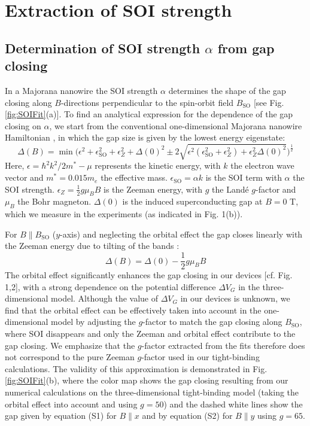 \newpage
\section{Extraction of SOI strength}
\subsection{Determination of SOI strength $\alpha$ from gap closing}
In a Majorana nanowire the SOI strength $\alpha$ determines the shape of the gap closing along $B$-directions perpendicular to the spin-orbit field $B_{\mathrm{SO}}$ \cite{VanHeck,Pan2018} [see Fig. \ref{fig:SOIFit}(a)]. To find an analytical expression for the dependence of the gap closing on $\alpha$, we start from the conventional one-dimensional Majorana nanowire Hamiltonian \cite{Lutchyn2010,Oreg2010}, in which the gap size is given by the lowest energy eigenstate:
\begin{equation}
\Delta(B) = \min \bigg( \epsilon^2 + \epsilon_{\mathrm{SO}}^2 + \epsilon_{Z}^2 + \Delta(0)^2 \pm 2 \sqrt{\epsilon^2 ( \epsilon_{\mathrm{SO}}^2+\epsilon_{Z}^2 ) + \epsilon_{Z}^2\Delta(0)^2} \bigg)^\frac{1}{2}
\end{equation}
Here, $\epsilon=\hbar^2k^2/2m^*-\mu$ represents the kinetic energy, with $k$ the electron wave vector and $m^*=0.015 m_e$ the effective mass. $\epsilon_{\mathrm{SO}}=\alpha k$ is the SOI term with $\alpha$ the SOI strength. $\epsilon_Z = \frac{1}{2}g\mu_BB$ is the Zeeman energy, with $g$ the Land\'e $g$-factor and $\mu_B$ the Bohr magneton. $\Delta(0)$ is the induced superconducting gap at $B = 0$ T, which we measure in the experiments (as indicated in Fig. 1(b)).

For $B \parallel B_{\mathrm{SO}}$ ($y$-axis) and neglecting the orbital effect the gap closes linearly with the Zeeman energy due to tilting of the bands \cite{Osca2014,Rex2014}: 
\begin{equation}
\Delta(B) = \Delta(0) - \frac{1}{2}g\mu_BB
\end{equation}
The orbital effect significantly enhances the gap closing in our devices [cf. Fig. 1,2], with a  strong dependence on the potential difference $\Delta V_G$ in the three-dimensional model. Although the value of $\Delta V_G$ in our devices is unknown, we find that the orbital effect can be effectively taken into account in the one-dimensional model by adjusting the $g$-factor to match the gap closing along $B_{\mathrm{SO}}$, where SOI disappears and only the Zeeman and orbital effect contribute to the gap closing. We emphasize that the $g$-factor extracted from the fits therefore does not correspond to the pure Zeeman $g$-factor used in our tight-binding calculations. The validity of this approximation is demonstrated in Fig. \ref{fig:SOIFit}(b), where the color map shows the gap closing resulting from our numerical calculations on the three-dimensional tight-binding model (taking the orbital effect into account and using $g = 50$) and the dashed white lines show the gap given by equation (S1) for $B\parallel x$ and by equation (S2) for $B\parallel y$ using $g=65$.


